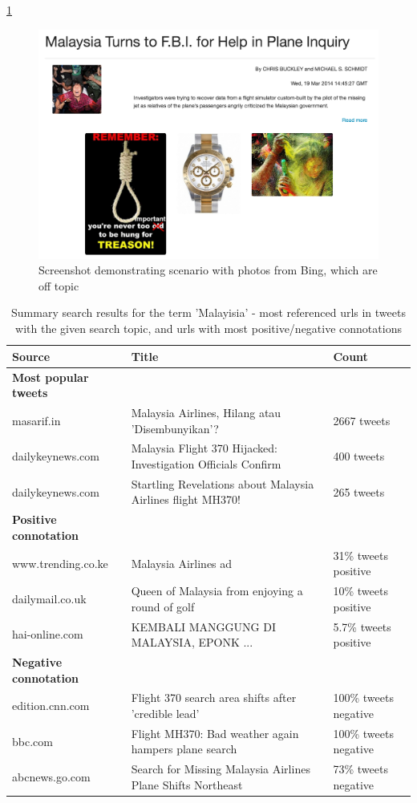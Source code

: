 \documentclass{acm_proc_10ptArticle-sp}
\begin{document}
\ref{screenshot:limitation}
\begin{figure}[H]
  \centering
  \includegraphics[width=0.9\linewidth]{img/limitation-ZK.png}
  \caption{Screenshot demonstrating scenario with photos from Bing, which are off topic}
  \label{screenshot:limitation}
\end{figure}

\begin{table}[!ht]
  \centering
  \caption{Summary search results for the term 'Malayisia' - most referenced urls in tweets with the given search topic, and urls with most positive/negative connotations}
    \label{table:summaryresults}
    \begin{tabular}{| l | l | l |}
	Source & Title & Count  \\ \hline
	\textbf{Most popular tweets} & \multicolumn{2}{c}{}  \\ \hline 
   masarif.in & Malaysia Airlines, Hilang atau 'Disembunyikan'? & 2667 tweets  \\ 
   dailykeynews.com & Malaysia Flight 370 Hijacked: Investigation Officials Confirm & 400 tweets \\
   dailykeynews.com & Startling Revelations about Malaysia Airlines flight MH370! & 265 tweets \\
  \textbf{Positive connotation} & \multicolumn{2}{c}{} \\ \hline 
   www.trending.co.ke & Malaysia Airlines ad &31\% tweets positive \\
   dailymail.co.uk & Queen of Malaysia from enjoying a round of golf & 10\% tweets positive  \\ 
   hai-online.com & KEMBALI MANGGUNG DI MALAYSIA, EPONK ... & 5.7\% tweets positive \\
   \textbf{Negative connotation} & \multicolumn{2}{c}{} \\ \hline 
   edition.cnn.com & Flight 370 search area shifts after 'credible lead' & 100\% tweets negative \\
   bbc.com & Flight MH370: Bad weather again hampers plane search & 100\% tweets negative \\
   abcnews.go.com & Search for Missing Malaysia Airlines Plane Shifts Northeast & 73\% tweets negative \\
  \end{tabular}
\end{table}
\end{document}
